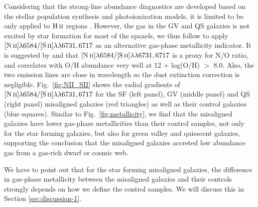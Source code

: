 Considering that the strong-line abundance diagnostics are developed based on the stellar population synthesis and photoionization models, it is limited to be only applied to $\hbox{H\,{\sc ii}}$ regions \citep{kewley_using_2002}. However, the gas in the GV and QS galaxies is not excited by star formation for most of the spaxels, we thus follow \citet{jin_sdss-iv_2016} to apply $\hbox{[N\,{\sc ii}]}\lambda6584/\hbox{[S\,{\sc ii}]}\lambda\lambda6731,6717$ as an alternative gas-phase metallicity indicator. It is suggested by \citet{dopita_chemical_2016} and \citet{kashino2016hide} that $\hbox{[N\,{\sc ii}]}\lambda6584/\hbox{[S\,{\sc ii}]}\lambda\lambda6731,6717$ is a proxy for N/O ratio, and correlates with O/H abundance very well at 12 + log(O/H) $>$ 8.0. Also, the two emission lines are close in wavelength so the dust extinction correction is negligible. Fig.~\ref{fig:NII_SII} shows the radial gradients of $\hbox{[N\,{\sc ii}]}\lambda6584/\hbox{[S\,{\sc ii}]}\lambda\lambda6731,6717$ for the SF (left panel), GV (middle panel) and QS (right panel) misaligned galaxies (red triangles) as well as their control galaxies (blue squares). Similar to Fig.~\ref{fig:metallicity}, we find that the misaligned galaxies have lower gas-phase metallicities than their control samples, not only for the star forming galaxies, but also for green valley and quiescent galaxies, supporting the conclusion that the misaligned galaxies accreted low abundance gas from a gas-rich dwarf or cosmic web.

We have to point out that for the star forming misaligned galaxies, the difference in gas-phase metallicity between the misaligned galaxies and their controls strongly depends on how we define the control samples. We will discuss this in Section \ref{sec:discussion-1}.
